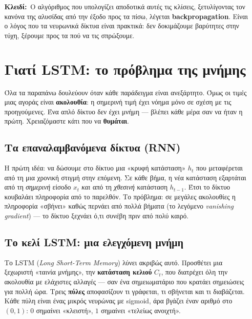 \documentclass[11pt]{article}
\newcommand{\key}[1]{\par\medskip\noindent\colorbox{soft}{\parbox{\dimexpr\linewidth-2\fboxsep}{\textcolor{accent}{\textbf{Κλειδί:}}\ #1}}\par\medskip}
\begin{document}
\key{Ο αλγόριθμος που υπολογίζει αποδοτικά αυτές τις κλίσεις, ξετυλίγοντας τον κανόνα της αλυσίδας
από την έξοδο προς τα πίσω, λέγεται \textbf{backpropagation}. Είναι ο λόγος που τα νευρωνικά δίκτυα
είναι πρακτικά: δεν δοκιμάζουμε βαρύτητες στην τύχη, ξέρουμε προς τα πού να τις σπρώξουμε.}

\section{Γιατί LSTM: το πρόβλημα της μνήμης}

Όλα τα παραπάνω δουλεύουν όταν κάθε παράδειγμα είναι ανεξάρτητο. Όμως οι τιμές μιας αγοράς είναι
\textbf{ακολουθία}: η σημερινή τιμή έχει νόημα μόνο σε σχέση με τις προηγούμενες. Ένα απλό δίκτυο δεν
έχει μνήμη --- βλέπει κάθε μέρα σαν να ήταν η πρώτη. Χρειαζόμαστε κάτι που να \textbf{θυμάται}.

\subsection{Τα επαναλαμβανόμενα δίκτυα (RNN)}
Η πρώτη ιδέα: να δώσουμε στο δίκτυο μια «κρυφή κατάσταση» $h_t$ που μεταφέρεται από τη μια χρονική
στιγμή στην επόμενη. Σε κάθε βήμα, η νέα κατάσταση εξαρτάται από τη \emph{σημερινή} είσοδο $x_t$
\emph{και} από τη \emph{χθεσινή} κατάσταση $h_{t-1}$. Έτσι το δίκτυο κουβαλάει πληροφορία από το
παρελθόν. Το πρόβλημα: σε μεγάλες ακολουθίες η πληροφορία «σβήνει» καθώς περνάει από πολλά βήματα (το
λεγόμενο \emph{vanishing gradient}) --- το δίκτυο ξεχνάει ό,τι συνέβη πριν από πολύ καιρό.

\subsection{Το κελί LSTM: μια ελεγχόμενη μνήμη}
Το LSTM (\emph{Long Short-Term Memory}) λύνει ακριβώς αυτό. Προσθέτει μια ξεχωριστή «ταινία μνήμης»,
την \textbf{κατάσταση κελιού} $C_t$, που διατρέχει όλη την ακολουθία με ελάχιστες αλλαγές --- σαν ένα
σημειωματάριο που κρατάει σημειώσεις για πολλή ώρα. Τρεις \textbf{πύλες} αποφασίζουν τι γράφεται, τι
σβήνεται και τι διαβάζεται. Κάθε πύλη είναι ένας μικρός νευρώνας με sigmoid, άρα βγάζει έναν αριθμό
στο $(0,1)$: $0$ σημαίνει «κλειστή», $1$ σημαίνει «τελείως ανοιχτή».
\end{document}

